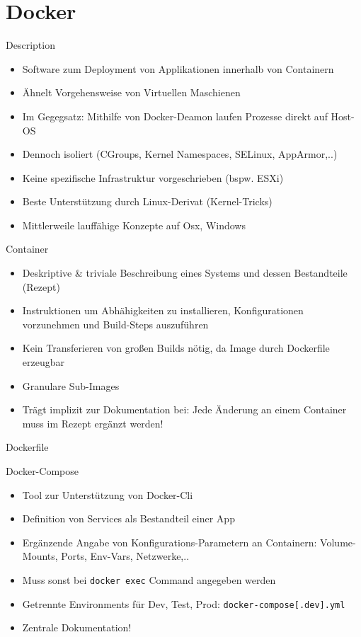 \documentclass[compress]{beamer}
\begin{document}
\section{Docker}
\begin{frame}{Description}
  \begin{itemize}
    \item Software zum Deployment von Applikationen innerhalb von Containern
    \item Ähnelt Vorgehensweise von Virtuellen Maschienen
    \item Im Gegegsatz: Mithilfe von Docker-Deamon laufen Prozesse direkt auf Host-OS
    \item Dennoch isoliert (CGroups, Kernel Namespaces, SELinux, AppArmor,..)
    \item Keine spezifische Infrastruktur vorgeschrieben (bspw. ESXi)
    \item Beste Unterstützung durch Linux-Derivat (Kernel-Tricks)
    \item Mittlerweile lauffähige Konzepte auf Osx, Windows
  \end{itemize}
\end{frame}
\begin{frame}{Container}
  \begin{itemize}
    \item Deskriptive \& triviale Beschreibung eines Systems und dessen Bestandteile (Rezept)
    \item Instruktionen um Abhähigkeiten zu installieren, Konfigurationen vorzunehmen und Build-Steps auszuführen
    \item Kein Transferieren von großen Builds nötig, da Image durch Dockerfile erzeugbar
    \item Granulare Sub-Images
    \item Trägt implizit zur Dokumentation bei: Jede Änderung an einem Container muss im Rezept ergänzt werden!
  \end{itemize}
\end{frame}
\begin{frame}{Dockerfile}
\end{frame}
\begin{frame}{Docker-Compose}
  \begin{itemize}
    \item Tool zur Unterstützung von Docker-Cli
    \item Definition von Services als Bestandteil einer App
    \item Ergänzende Angabe von Konfigurations-Parametern an Containern: Volume-Mounts, Ports, Env-Vars, Netzwerke,..
    \item Muss sonst bei \texttt{docker exec} Command angegeben werden
    \item Getrennte Environments für Dev, Test, Prod: \texttt{docker-compose[.dev].yml}
    \item Zentrale Dokumentation!
  \end{itemize}
\end{frame}
\end{document}
